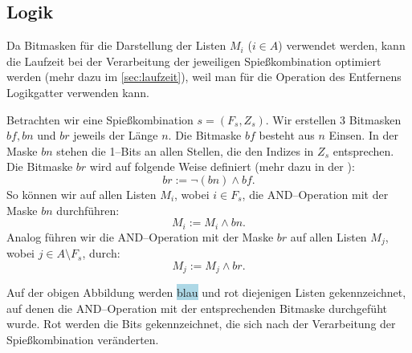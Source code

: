 \subsection{Logik}\label{sec:logik}
Da Bitmasken für die Darstellung der Listen $M_i$ ($i \in A$) verwendet werden, kann
die Laufzeit bei der Verarbeitung der jeweiligen Spießkombination optimiert werden
(mehr dazu im \cref{sec:laufzeit}),
weil man für die Operation des Entfernens Logikgatter verwenden kann.

Betrachten wir eine Spießkombination $s = (F_s, Z_s)$.
Wir erstellen 3 Bitmasken $bf, bn$ und $br$ jeweils der Länge $n$.
Die Bitmaske $bf$ besteht aus $n$ Einsen.
In der Maske $bn$ stehen die 1--Bits an allen Stellen, die den Indizes in $Z_s$ entsprechen.
Die Bitmaske $br$ wird auf folgende Weise definiert (mehr dazu in der ):
\[
br := \neg(bn) \land bf.
\]
\noindent So können wir auf allen Listen $M_i$, wobei $i \in F_s$, die AND--Operation mit der Maske $bn$ 
durchführen:
\[
M_i := M_i \land bn.
\]
Analog führen wir die AND--Operation mit der Maske $br$ auf allen Listen $M_j$,
wobei $j \in A \setminus F_s$, durch:
\[
M_j := M_j \land br.
\]



Auf der obigen Abbildung werden \colorbox{lightblue}{blau} und \colorbox{lightred}{rot} diejenigen
Listen gekennzeichnet, auf denen die AND--Operation mit der entsprechenden Bitmaske durchgefüht wurde.
{\color{red} Rot} werden die Bits gekennzeichnet, die sich nach der Verarbeitung der Spießkombination veränderten.


